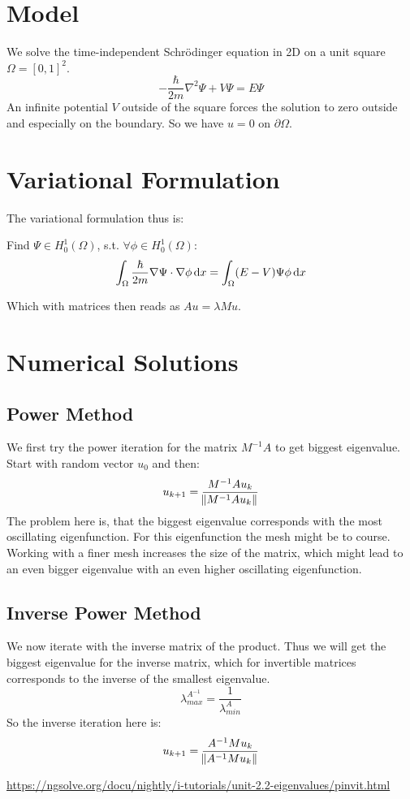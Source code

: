 \documentclass[a4paper,11pt]{scrartcl}
\newcommand*{\dx}{\dif{}x}
\begin{document}
\section*{Model}
We solve the time-independent Schrödinger equation in 2D on a unit square
$\Omega = [0,1]^2$.
\[ -\frac{\hbar}{2m} \nabla^2 \Psi + V \Psi = E \Psi\]
An infinite potential $V$ outside of the square forces the solution to zero
outside and especially on the boundary.
So we have $u = 0$ on $\partial\Omega$.

\section*{Variational Formulation}
The variational formulation thus is:

Find $\Psi \in H^1_0(\Omega)$, s.t. $\forall \phi \in H^1_0(\Omega)$:
\[ \int_{\Omega} \frac{\hbar}{2m} \nabla \Psi \cdot \nabla\phi \dx =
  \int_{\Omega} (E - V) \Psi \phi\dx\]

Which with matrices then reads as $A u = \lambda M u$.

\section*{Numerical Solutions}
\subsection*{Power Method}
We first try the power iteration for the matrix $M^{-1} A$ to get biggest eigenvalue.
Start with random vector $u_0$ and then:
\[ u_{k+1} = \frac{M^{-1} A u_k}{\norm{M^{-1}Au_k}}\]
The problem here is, that the biggest eigenvalue corresponds with the most
oscillating eigenfunction.
For this eigenfunction the mesh might be to course.
Working with a finer mesh increases the size of the matrix, which might lead to
an even bigger eigenvalue with an even higher oscillating eigenfunction.

\subsection*{Inverse Power Method}
We now iterate with the inverse matrix of the product.
Thus we will get the biggest eigenvalue for the inverse matrix, which for
invertible matrices corresponds to the inverse of the smallest eigenvalue.
\[ \lambda^{A^{-1}}_{max} = \frac{1}{\lambda^A_{min}} \]
So the inverse iteration here is:
\[ u_{k+1} = \frac{A^{-1} M u_k}{\norm{A^{-1}Mu_k}}\]

\url{https://ngsolve.org/docu/nightly/i-tutorials/unit-2.2-eigenvalues/pinvit.html}
\end{document}
